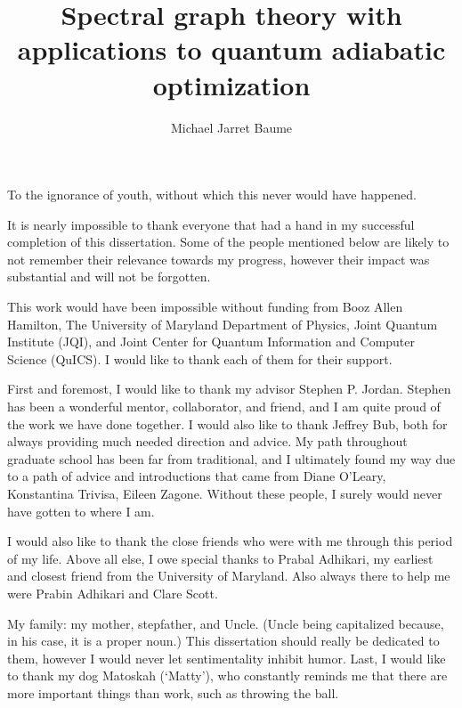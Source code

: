\documentclass[letterpaper,12pt]{umd-thesis}
\title{Spectral graph theory with applications to quantum adiabatic optimization} %
\author{Michael Jarret Baume} %
\numberwithin{equation}{chapter}  %
\numberwithin{thm}{chapter}
\numberwithin{lem}{chapter}
\numberwithin{cor}{chapter}
\numberwithin{definition}{chapter}
\begin{document}
\begin{abstract}
    \lipsum[1]
\end{abstract} 

\begin{preliminary}

	

	\begin{dedication}
		To the ignorance of youth, without which this never would have happened.
	\end{dedication}

	\begin{acknowledgements}
		It is nearly impossible to thank everyone that had a hand in my successful completion of this dissertation. Some of the people mentioned below are likely to not remember their relevance towards my progress, however their impact was substantial and will not be forgotten.
		
		This work would have been impossible without funding from Booz Allen Hamilton, The University of Maryland Department of Physics, Joint Quantum Institute (JQI), and Joint Center for Quantum Information and Computer Science (QuICS). I would like to thank each of them for their support. 
		
		First and foremost, I would like to thank my advisor Stephen P. Jordan. Stephen has been a wonderful mentor, collaborator, and friend, and I am quite proud of the work we have done together. I would also like to thank Jeffrey Bub, both for always providing much needed direction and advice. My path throughout graduate school has been far from traditional, and I ultimately found my way due to a path of advice and introductions that came from Diane O'Leary, Konstantina Trivisa, Eileen Zagone. Without these people, I surely would never have gotten to where I am.
		
		I would also like to thank the close friends who were with me through this period of my life. Above all else, I owe special thanks to Prabal Adhikari, my earliest and closest friend from the University of Maryland. Also always there to help me were Prabin Adhikari and Clare Scott. 
		
		My family: my mother, stepfather, and Uncle. (Uncle being capitalized because, in his case, it is a proper noun.) This dissertation should really be dedicated to them, however I would never let sentimentality inhibit humor. Last, I would like to thank my dog Matoskah (`Matty'), who constantly reminds me that there are more important things than work, such as throwing the ball.
	\end{acknowledgements}
\end{preliminary}
\end{document}
